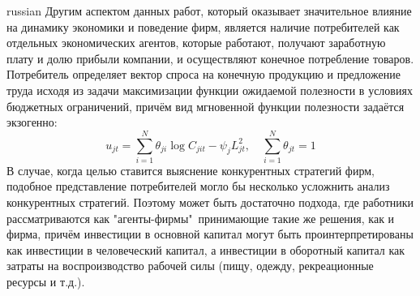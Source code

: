 \documentclass[9pt]{article}
\begin{document}
\begin{otherlanguage*}{russian}
Другим аспектом данных работ, который оказывает значительное влияние на динамику экономики и поведение фирм, является наличие потребителей как отдельных экономических агентов, которые работают, получают заработную плату и долю прибыли компании, и осуществляют конечное потребление товаров. Потребитель определяет вектор спроса на конечную продукцию и предложение труда исходя из задачи максимизации функции ожидаемой полезности в условиях бюджетных ограничений, причём вид мгновенной функции полезности задаётся экзогенно:
$$u_{jt}=\sum_{i=1}^N \theta_{ji} \log C_{jit} - \psi_j L_{jt}^2, \quad \sum_{i=1}^N \theta_{jt} =1$$
В случае, когда целью ставится выяснение конкурентных стратегий фирм, подобное представление потребителей могло бы несколько усложнить анализ конкурентных стратегий. Поэтому может быть достаточно подхода, где работники рассматриваются как "агенты-фирмы"\, принимающие такие же решения, как и фирма, причём инвестиции в основной капитал могут быть проинтерпретированы как инвестиции в человеческий капитал, а инвестиции в оборотный капитал как затраты на воспроизводство рабочей силы (пищу, одежду, рекреационные ресурсы и т.д.).
\end{otherlanguage*} 
\end{document}
